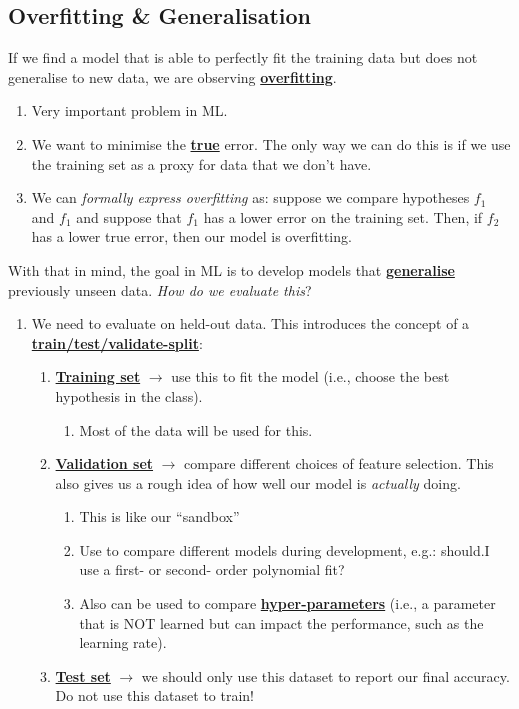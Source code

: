 \documentclass[11pt]{scrartcl}
\theoremstyle{definition}
\theoremstyle{remark}
\newcommand{\dfn}[1]{\textbf{\underline{#1}}}
\begin{document}
\subsection{Overfitting \& Generalisation}

If we find a model that is able to perfectly fit the training data but does not generalise to new data, we are observing \dfn{overfitting}. 
\begin{enumerate}[noitemsep]
	\item Very important problem in ML. 
	\item We want to minimise the \dfn{true} error. The only way we can do this is if we use the training set as a proxy for data that we don't have. 
	\item We can \emph{formally express overfitting} as: suppose we compare hypotheses $f_1$ and $f_1$ and suppose that $f_1$ has a lower error on the training set. Then, if $f_2$ has a lower true error, then our model is overfitting. 
\end{enumerate}
With that in mind, the goal in ML is to develop models that \dfn{generalise} previously unseen data. \emph{How do we evaluate this}? 
\begin{enumerate}[noitemsep]
	\item We need to evaluate on held-out data. This introduces the concept of a \dfn{train/test/validate-split}: 
	\begin{enumerate}[noitemsep]
		\item \dfn{Training set} $\rightarrow$ use this to fit the model (i.e., choose the best hypothesis in the class). 
		\begin{enumerate}[noitemsep]
			\item Most of the data will be used for this. 
		\end{enumerate}
		\item \dfn{Validation set} $\rightarrow$ compare different choices of feature selection. This also gives us a rough idea of how well our model is \emph{actually} doing. 
		\begin{enumerate}[noitemsep]
			\item This is like our ``sandbox''
			\item Use to compare different models during development, e.g.: should.I use a first- or second- order polynomial fit? 
			\item Also can be used to compare \dfn{hyper-parameters} (i.e., a parameter that is NOT learned but can impact the performance, such as the learning rate). 
		\end{enumerate}
		\item \dfn{Test set} $\rightarrow$ we should only use this dataset to report our final accuracy. Do not use this dataset to train!
	\end{enumerate}
\end{enumerate}
\end{document}
